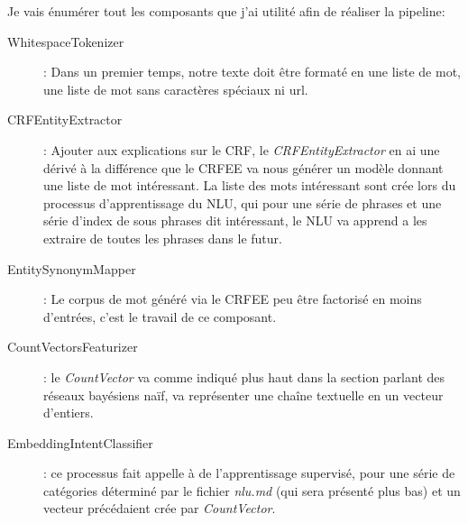 Je vais énumérer tout les composants que j'ai utilité afin de réaliser la pipeline:
\begin{description}
\item[WhitespaceTokenizer]: Dans un premier temps, notre texte doit être formaté en une liste de mot, une liste de mot sans caractères spéciaux ni url.
\item[CRFEntityExtractor]: Ajouter aux explications sur le CRF, le \textit{CRFEntityExtractor} en ai une dérivé à la différence que le CRFEE va nous générer un modèle donnant une liste de mot intéressant. La liste des mots intéressant sont crée lors du processus d'apprentissage du NLU, qui pour une série de phrases et une série d'index de sous phrases dit intéressant, le NLU va apprend a les extraire de toutes les phrases dans le futur.
\item[EntitySynonymMapper]: Le corpus de mot généré via le CRFEE peu être factorisé en moins d'entrées, c'est le travail de ce composant.
\item[CountVectorsFeaturizer]: le \textit{CountVector} va comme indiqué plus haut dans la section parlant des réseaux bayésiens naïf, va représenter une chaîne textuelle en un vecteur d'entiers.
\item[EmbeddingIntentClassifier]: ce processus fait appelle à de l'apprentissage supervisé, pour une série de catégories déterminé par le fichier \textit{nlu.md} (qui sera présenté plus bas) et un vecteur précédaient crée par \textit{CountVector}.
\end{description}
